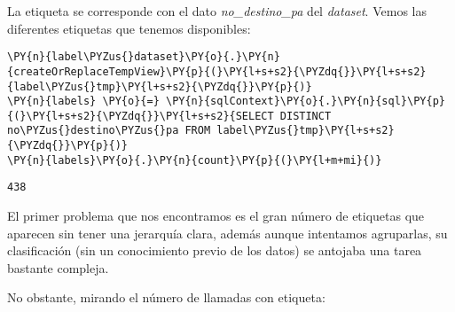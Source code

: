 La etiqueta se corresponde con el dato \textit{no\_destino\_pa} del \textit{dataset}. Vemos las diferentes etiquetas que tenemos disponibles: 
\vspace{0.5cm}
 \begin{tcolorbox}[breakable, size=fbox, boxrule=1pt, pad at break*=1mm,colback=cellbackground, colframe=cellborder]
\begin{Verbatim}[commandchars=\\\{\}]
\PY{n}{label\PYZus{}dataset}\PY{o}{.}\PY{n}{createOrReplaceTempView}\PY{p}{(}\PY{l+s+s2}{\PYZdq{}}\PY{l+s+s2}{label\PYZus{}tmp}\PY{l+s+s2}{\PYZdq{}}\PY{p}{)}
\PY{n}{labels} \PY{o}{=} \PY{n}{sqlContext}\PY{o}{.}\PY{n}{sql}\PY{p}{(}\PY{l+s+s2}{\PYZdq{}}\PY{l+s+s2}{SELECT DISTINCT no\PYZus{}destino\PYZus{}pa FROM label\PYZus{}tmp}\PY{l+s+s2}{\PYZdq{}}\PY{p}{)}
\PY{n}{labels}\PY{o}{.}\PY{n}{count}\PY{p}{(}\PY{l+m+mi}{)}
\end{Verbatim}
\end{tcolorbox}
 
   \begin{tcolorbox}[breakable, size=fbox, boxrule=.5pt, pad at break*=1mm, opacityfill=0]
  \begin{Verbatim}[commandchars=\\\{\}]
  438
  \end{Verbatim}
  \end{tcolorbox}
 
El primer problema que nos encontramos es el gran número de etiquetas que aparecen sin tener una jerarquía clara, además aunque intentamos agruparlas, su clasificación (sin un conocimiento previo de los datos) se antojaba una tarea bastante compleja. 

No obstante, mirando el número de llamadas con etiqueta: 


